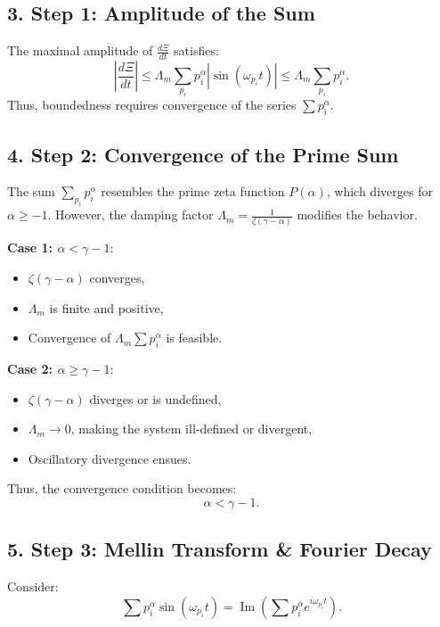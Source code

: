 \documentclass[12pt]{article}
\theoremstyle{plain}
\begin{document}
\subsection*{3. Step 1: Amplitude of the Sum}

The maximal amplitude of \( \frac{d\Xi}{dt} \) satisfies:
\[
\left| \frac{d\Xi}{dt} \right| \leq \Lambda_m \sum_{p_i} p_i^\alpha |\sin(\omega_{p_i} t)| \leq \Lambda_m \sum_{p_i} p_i^\alpha.
\]
Thus, boundedness requires convergence of the series \( \sum p_i^\alpha \).

\subsection*{4. Step 2: Convergence of the Prime Sum}

The sum \( \sum_{p_i} p_i^\alpha \) resembles the prime zeta function \( P(\alpha) \), which diverges for \( \alpha \geq -1 \). However, the damping factor \( \Lambda_m = \frac{1}{\zeta(\gamma - \alpha)} \) modifies the behavior.

\textbf{Case 1: \( \alpha < \gamma - 1 \)}:
\begin{itemize}
    \item \( \zeta(\gamma - \alpha) \) converges,
    \item \( \Lambda_m \) is finite and positive,
    \item Convergence of \( \Lambda_m \sum p_i^\alpha \) is feasible.
\end{itemize}

\textbf{Case 2: \( \alpha \geq \gamma - 1 \)}:
\begin{itemize}
    \item \( \zeta(\gamma - \alpha) \) diverges or is undefined,
    \item \( \Lambda_m \to 0 \), making the system ill-defined or divergent,
    \item Oscillatory divergence ensues.
\end{itemize}

Thus, the convergence condition becomes:
\[
\boxed{\alpha < \gamma - 1}.
\]

\subsection*{5. Step 3: Mellin Transform \& Fourier Decay}

Consider:
\[
\sum p_i^\alpha \sin(\omega_{p_i} t) = \operatorname{Im} \left( \sum p_i^\alpha e^{i \omega_{p_i} t} \right).
\]
\end{document}
